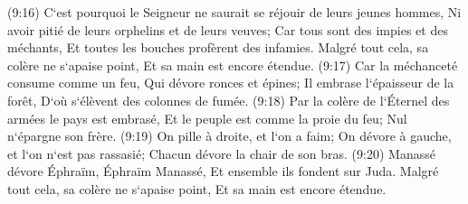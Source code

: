 \verse (9:16) C`est pourquoi le Seigneur ne saurait se réjouir de leurs jeunes hommes, Ni avoir pitié de leurs orphelins et de leurs veuves; Car tous sont des impies et des méchants, Et toutes les bouches profèrent des infamies. Malgré tout cela, sa colère ne s`apaise point, Et sa main est encore étendue. 
\verse (9:17) Car la méchanceté consume comme un feu, Qui dévore ronces et épines; Il embrase l`épaisseur de la forêt, D`où s`élèvent des colonnes de fumée. 
\verse (9:18) Par la colère de l`Éternel des armées le pays est embrasé, Et le peuple est comme la proie du feu; Nul n`épargne son frère. 
\verse (9:19) On pille à droite, et l`on a faim; On dévore à gauche, et l`on n`est pas rassasié; Chacun dévore la chair de son bras. 
\verse (9:20) Manassé dévore Éphraïm, Éphraïm Manassé, Et ensemble ils fondent sur Juda. Malgré tout cela, sa colère ne s`apaise point, Et sa main est encore étendue. 

